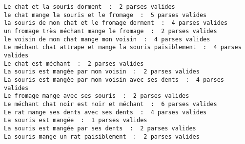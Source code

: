 \documentclass[12pt]{article}
\theoremstyle{exostyle}
\begin{document}
\begin{verbatim}
Le chat et la souris dorment  :  2 parses valides
le chat mange la souris et le fromage  :  5 parses valides
la souris de mon chat et le fromage dorment  :  4 parses valides
un fromage très méchant mange le fromage  :  2 parses valides
le voisin de mon chat mange mon voisin  :  4 parses valides
Le méchant chat attrape et mange la souris paisiblement  :  4 parses valides
Le chat est méchant  :  2 parses valides
La souris est mangée par mon voisin  :  2 parses valides
La souris est mangée par mon voisin avec ses dents  :  4 parses valides
Le fromage mange avec ses souris  :  2 parses valides
Le méchant chat noir est noir et méchant  :  6 parses valides
Le rat mange ses dents avec ses dents  :  4 parses valides
La souris est mangée  :  1 parses valides
La souris est mangée par ses dents  :  2 parses valides
La souris mange un rat paisiblement  :  2 parses valides
\end{verbatim}
\end{document}
